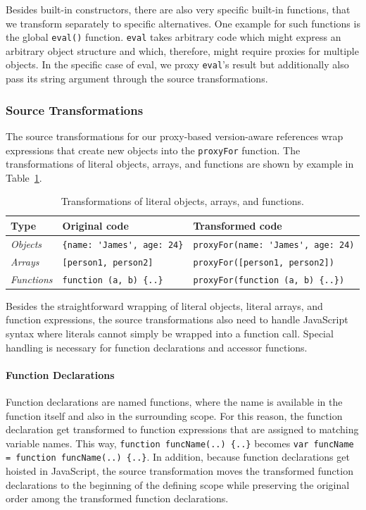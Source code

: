 Besides built-in constructors, there are also very specific built-in functions, that we transform separately to specific alternatives.
One example for such functions is the global \lstinline{eval()} function.
\lstinline{eval} takes arbitrary code which might express an arbitrary object structure and which, therefore, might require proxies for multiple objects.
In the specific case of eval, we proxy \lstinline{eval}'s result but additionally also pass its string argument through the source transformations.


\subsubsection{Source Transformations}

The source transformations for our proxy-based version-aware references wrap expressions that create new objects into the \lstinline{proxyFor} function.
The transformations of literal objects, arrays, and functions are shown by example in Table~\ref{table:literalTransforms}.

\begin{table}[h]
\begin{center}
\begin{tabular}{| l | l | l |}
\hline
Type & Original code & Transformed code \\ \hline
\emph{Objects} & \lstinline|{name: 'James', age: 24}| & \lstinline|proxyFor(name: 'James', age: 24)| \\ \hline
\emph{Arrays} & \lstinline|[person1, person2]| & \lstinline|proxyFor([person1, person2])| \\ \hline
\emph{Functions} & \lstinline|function (a, b) {..}| & \lstinline|proxyFor(function (a, b) {..})| \\ \hline
\end{tabular}
\end{center}
\caption[Table caption text]{Transformations of literal objects, arrays, and functions.}
\label{table:literalTransforms}
\end{table}


Besides the straightforward wrapping of literal objects, literal arrays, and function expressions, the source transformations also need to handle JavaScript syntax where literals cannot simply be wrapped into a function call.
Special handling is necessary for function declarations and accessor functions.

\paragraph{Function Declarations}
Function declarations are named functions, where the name is available in the function itself and also in the surrounding scope.
For this reason, the function declaration get transformed to function expressions that are assigned to matching variable names.
This way, \lstinline|function funcName(..) {..}| becomes \lstinline|var funcName = function funcName(..) {..}|.
In addition, because function declarations get hoisted in JavaScript, the source transformation moves the transformed function declarations to the beginning of the defining scope while preserving the original order among the transformed function declarations.

